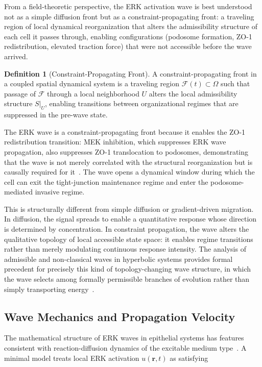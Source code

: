 \documentclass[11pt,a4paper]{article}
\theoremstyle{plain}
\theoremstyle{definition}
\newtheorem{definition}[theorem]{Definition}
\begin{document}
From a field-theoretic perspective, the ERK activation wave is best understood not as a
simple diffusion front but as a constraint-propagating front: a traveling region of local
dynamical reorganization that alters the admissibility structure of each cell it passes
through, enabling configurations (podosome formation, ZO-1 redistribution, elevated
traction force) that were not accessible before the wave arrived.

\begin{definition}[Constraint-Propagating Front]
A constraint-propagating front in a coupled spatial dynamical system is a traveling
region $\mathcal{F}(t) \subset \Omega$ such that passage of $\mathcal{F}$ through a
local neighborhood $U$ alters the local admissibility structure $S|_U$, enabling
transitions between organizational regimes that are suppressed in the pre-wave state.
\end{definition}

The ERK wave is a constraint-propagating front because it enables the ZO-1 redistribution
transition: MEK inhibition, which suppresses ERK wave propagation, also suppresses ZO-1
translocation to podosomes, demonstrating that the wave is not merely correlated with
the structural reorganization but is causally required for it~\cite{Hirano2026}.
The wave opens a dynamical window during which the cell can exit the tight-junction
maintenance regime and enter the podosome-mediated invasive regime.

This is structurally different from simple diffusion or gradient-driven migration.
In diffusion, the signal spreads to enable a quantitative response whose direction is
determined by concentration. In constraint propagation, the wave alters the qualitative
topology of local accessible state space: it enables regime transitions rather than
merely modulating continuous response intensity. The analysis of admissible and
non-classical waves in hyperbolic systems provides formal precedent for precisely this
kind of topology-changing wave structure, in which the wave selects among formally
permissible branches of evolution rather than simply transporting energy~\cite{ElAbbassi2025}.

\subsection{Wave Mechanics and Propagation Velocity}

The mathematical structure of ERK waves in epithelial systems has features consistent
with reaction-diffusion dynamics of the excitable medium type~\cite{Murray2003}. A
minimal model treats local ERK activation $u(\mathbf{r}, t)$ as satisfying
\end{document}

